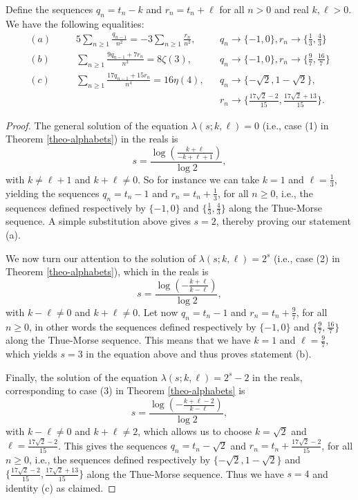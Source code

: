 \documentclass[12pt,reqno]{article}
\begin{document}
\begin{proposition}
	Define the sequences $q_n = t_n - k$ and $r_n = t_n + \ell$ for all $n>0$ and real $k,\ell>0$. We have the following equalities:
	\begin{align*}
		(a)& \ \ \ \  \ \ \ \ 5 \sum_{n\geq1} \frac{q_{n-1}}{n^2} = -3 \sum_{n\geq1} \frac{r_n}{n^2}, & & q_n \to \{-1,0\}, r_n \to \{\frac13,\frac43\} \\
		(b)&  \ \ \ \  \ \ \ \ \sum_{n\geq1} \frac{9 q_{n-1} + 7 r_n}{n^3} = 8 \zeta(3), & & q_n \to \{-1,0\}, r_n\to \{\frac97,\frac{16}{7}\} \\
		(c)& \ \ \ \  \ \ \ \ \sum_{n\geq1} \frac{17 q_{n-1} + 15 r_n}{n^4} = 16 \eta(4), & & q_n\to\{-\sqrt2,1-\sqrt2\}, \\
		& & & r_n\to\{\frac{17\sqrt2 -2}{15},\frac{17\sqrt2 +13}{15}\}.
	\end{align*}
\end{proposition}
\begin{proof}
	The general solution of the equation $\lambda(s;k,\ell)=0$ (i.e., case (1) in Theorem \ref{theo-alphabets}) in the reals is
	$$
	s=\frac{\log(\frac{k+\ell}{-k+\ell+1})}{\log2},
	$$
	with $k\neq \ell+1$ and $k+\ell\neq 0$. So for instance we can take $k=1$ and $\ell=\frac13$, yielding the  sequences $q_n=t_n-1$ and $r_n=t_n+\frac13$, for all $n\geq0$, i.e., the sequences defined respectively by $\{-1,0\}$ and $\{\frac13,\frac43\}$ along the Thue-Morse sequence. A simple substitution above gives $s=2$, thereby proving our statement (a).
	
	We now turn our attention to the solution of $\lambda(s;k,\ell)=2^s$ (i.e., case (2) in Theorem \ref{theo-alphabets}), which in the reals is
	$$
	s=\frac{\log(-\frac{k+\ell}{k-\ell})}{\log2},
	$$
	with $k-\ell\neq 0$ and $k+\ell\neq 0$. Let now $q_n=t_n-1$ and $r_n=t_n+\frac97$, for all $n\geq0$, in other words the sequences defined respectively by $\{-1,0\}$ and $\{\frac97,\frac{16}{7}\}$ along the Thue-Morse sequence. This means that we have $k=1$ and $\ell=\frac97$, which yields $s=3$ in the equation above and thus proves statement (b).
	
	Finally, the solution of the equation $\lambda(s;k,\ell)=2^s-2$ in the reals, corresponding to case (3) in Theorem \ref{theo-alphabets} is
	$$
	s=\frac{\log(-\frac{k+\ell-2}{k-\ell})}{\log2},
	$$
	with $k-\ell\neq 0$ and $k+\ell\neq 2$, which allows us to choose $k=\sqrt2$ and $\ell=\frac{17\sqrt2 -2}{15}$. This gives the sequences $q_n=t_n-\sqrt2$ and $r_n=t_n+\frac{17\sqrt2 -2}{15}$, for all $n\geq0$, i.e., the sequences defined respectively by $\{-\sqrt2,1-\sqrt2\}$ and $\{\frac{17\sqrt2 -2}{15},\frac{17\sqrt2 +13}{15}\}$ along the Thue-Morse sequence. Thus we have $s=4$ and identity (c) as claimed.
\end{proof}
\end{document}
